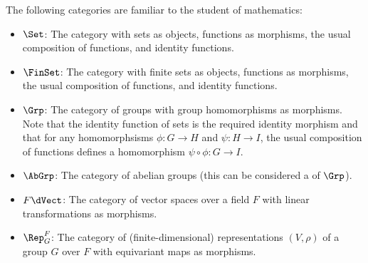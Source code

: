 \documentclass[a5paper]{article}
\begin{document}
\begin{example}
	The following categories are familiar to the student of
  mathematics:
  \begin{itemize}
    \itemsep-0.2em
    \item $\Set$: The category with sets as objects, functions as morphisms,
      the usual composition of functions, and identity functions.
    \item $\FinSet$: The category with finite sets as objects, functions as
      morphisms, the usual composition of functions, and identity functions.
    \item $\Grp$: The category of groups with group homomorphisms
      as morphisms. Note that the identity function of sets is the required
      identity morphism and that for any homomorphsisms $ϕ:G\to H$ and
      $ψ:H\to I$, the usual composition of functions defines a homomorphism
      $ψ\circ  ϕ:G\to I$.
    \item $\AbGrp$: The category of abelian groups (this can be considered a
       of $\Grp$).
    \item $F\dVect$: The category of vector spaces over a
      field $F$ with linear transformations as morphisms.
    \item $\Rep_G^F$: The category of (finite-dimensional) representations
      $(V,\rho)$ of a group $G$ over $F$ with equivariant maps as morphisms. 
  \end{itemize}
\end{example}
\end{document}
